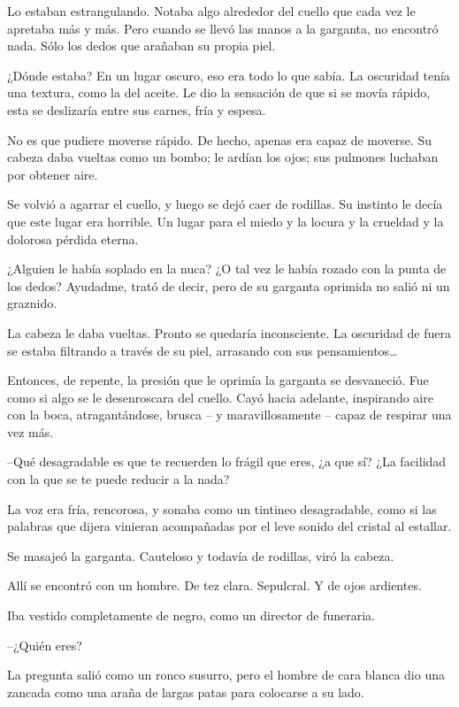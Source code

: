 Lo estaban estrangulando. Notaba algo alrededor del cuello que cada vez le apretaba más y más. Pero cuando se llevó las manos a la garganta, no encontró nada. Sólo los dedos que arañaban su propia piel.

¿Dónde estaba? En un lugar oscuro, eso era todo lo que sabía. La oscuridad tenía una textura, como la del aceite. Le dio la sensación de que si se movía rápido, esta se deslizaría entre sus carnes, fría y espesa.

No es que pudiere moverse rápido. De hecho, apenas era capaz de moverse. Su cabeza daba vueltas como un bombo; le ardían los ojos; sus pulmones luchaban por obtener aire.

Se volvió a agarrar el cuello, y luego se dejó caer de rodillas. Su instinto le decía que este lugar era horrible. Un lugar para el miedo y la locura y la crueldad y la dolorosa pérdida eterna.

¿Alguien le había soplado en la nuca? ¿O tal vez le había rozado con la punta de los dedos? Ayudadme, trató de decir, pero de su garganta oprimida no salió ni un graznido.

La cabeza le daba vueltas. Pronto se quedaría inconsciente. La oscuridad de fuera se estaba filtrando a través de su piel, arrasando con sus pensamientos…

Entonces, de repente, la presión que le oprimía la garganta se desvaneció. Fue como si algo se le desenroscara del cuello. Cayó hacia adelante, inspirando aire con la boca, atragantándose, brusca – y maravillosamente – capaz de respirar una vez más.

--Qué desagradable es que te recuerden lo frágil que eres, ¿a que sí? ¿La facilidad con la que se te puede reducir a la nada?

La voz era fría, rencorosa, y sonaba como un tintineo desagradable, como si las palabras que dijera vinieran acompañadas por el leve sonido del cristal al estallar.

Se masajeó la garganta. Cauteloso y todavía de rodillas, viró la cabeza.

Allí se encontró con un hombre. De tez clara. Sepulcral. Y de ojos ardientes.

Iba vestido completamente de negro, como un director de funeraria.

--¿Quién eres?

La pregunta salió como un ronco susurro, pero el hombre de cara blanca dio una zancada como una araña de largas patas para colocarse a su lado.

